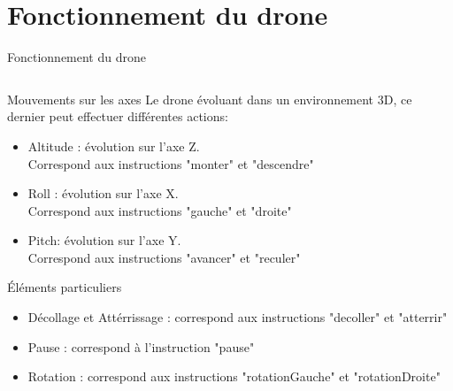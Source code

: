 \documentclass{bredelebeamer}
\begin{document}
\section{Fonctionnement du drone}

\begin{frame}{Fonctionnement du drone}

\begin{columns}

\begin{column}{0.65\textwidth}

\begin{block}{Mouvements sur les axes}
Le drone évoluant dans un environnement 3D, ce dernier peut effectuer différentes actions: \\
\begin{itemize}
\item Altitude : évolution sur l'axe Z. \\Correspond aux instructions "\alert{monter}" et "\alert{descendre}"
\item Roll : évolution sur l'axe X. \\Correspond aux instructions "\alert{gauche}" et "\alert{droite}"
\item Pitch: évolution sur l'axe Y. \\Correspond aux instructions "\alert{avancer}" et "\alert{reculer}"
\end{itemize}
\end{block}\pause

\begin{exampleblock}{Éléments particuliers}
\begin{itemize}
\item Décollage et Attérrissage : correspond aux instructions "\alert{decoller}" et "\alert{atterrir}"
\item Pause : correspond à l'instruction "\alert{pause}"
\item Rotation : correspond aux instructions "\alert{rotationGauche}" et "\alert{rotationDroite}"
\end{itemize}
\end{exampleblock}\pause


\end{column}
\end{columns}
\end{frame}
\end{document}
